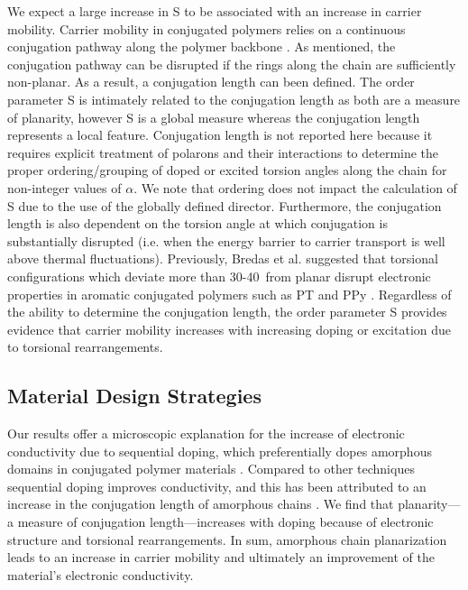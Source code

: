 We expect a large increase in S to be associated with an increase in carrier mobility. Carrier mobility in conjugated polymers relies on a continuous conjugation pathway along the polymer backbone \cite{Shin2010}. As mentioned, the conjugation pathway can be disrupted if the rings along the chain are sufficiently non-planar. As a result, a conjugation length can been defined. The order parameter S is intimately related to the conjugation length as both are a measure of planarity, however S is a global measure whereas the conjugation length represents a local feature. Conjugation length is not reported here because it requires explicit treatment of polarons and their interactions to determine the proper ordering/grouping of doped or excited torsion angles along the chain for non-integer values of $\alpha$. We note that ordering does not impact the calculation of S due to the use of the globally defined director. Furthermore, the conjugation length is also dependent on the torsion angle at which conjugation is substantially disrupted (i.e. when the energy barrier to carrier transport is well above thermal fluctuations). Previously, Bredas et al. suggested that torsional configurations which deviate more than 30-40\textdegree \ from planar disrupt electronic properties in aromatic conjugated polymers such as PT and PPy \cite{Bredas1985}. Regardless of the ability to determine the conjugation length, the order parameter S provides evidence that carrier mobility increases with increasing doping or excitation due to torsional rearrangements.

\subsection{Material Design Strategies}

Our results offer a microscopic explanation for the increase of electronic conductivity due to sequential doping, which preferentially dopes amorphous domains in conjugated polymer materials \cite{Chew2017, Jacobs2016}. Compared to other techniques sequential doping improves conductivity, and this has been attributed to an increase in the conjugation length of amorphous chains \cite{Chew2017}. We find that planarity---a measure of conjugation length---increases with doping because of electronic structure and torsional rearrangements. In sum, amorphous chain planarization leads to an increase in carrier mobility and ultimately an improvement of the material's electronic conductivity.

